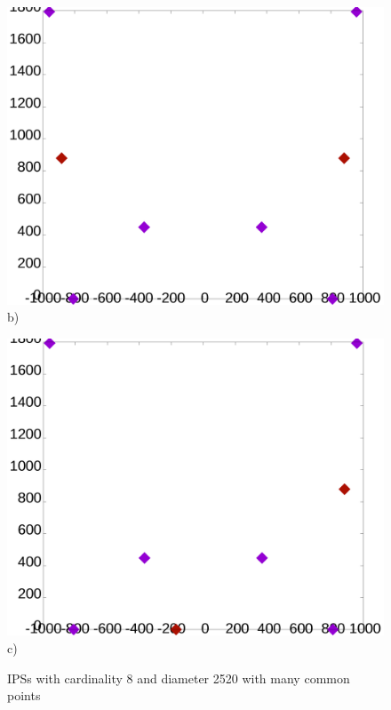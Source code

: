 \documentclass[12pt]{article}
\theoremstyle{theorem}
\theoremstyle{dfn}
\theoremstyle{remark}
\begin{document}
\begin{figure}[h!]
\begin{minipage}[h]{0.32\linewidth}
\begin{center}
			\includegraphics[width=1\linewidth]{./img/8_2520_143_symm2.png}\\ b)
		\end{center}
	\end{minipage}
	\begin{minipage}[h]{0.32\linewidth}
		\begin{center}
			\includegraphics[width=1\linewidth]{./img/8_2520_143_4a27_other.png}\\ c)
		\end{center}
	\end{minipage}
	\hfill
	\caption{IPSs with cardinality 8 and diameter 2520 with many common points}
	\label{8_with_many_common}
\end{figure}
\end{document}
